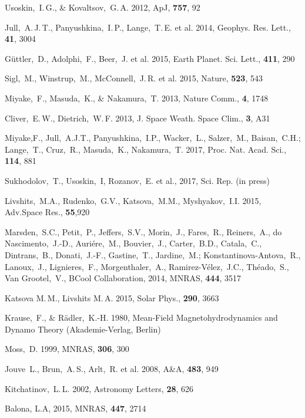\documentclass[fleqn,12pt]{SelfArx} %
\begin{document}
\begin{thebibliography}{99}
Usoskin,~I.\,G., \& Kovaltsov,~G.\,A. 2012, ApJ, \textbf{757}, 92


Jull,~A.\,J.\,T., Panyushkina,~I.\,P., Lange,~T.\,E. et al. 2014, Geophys. Res. Lett., \textbf{41}, 3004



G\"uttler,~D., Adolphi,~F., Beer,~J. et al. 2015,  Earth Planet. Sci. Lett., \textbf{411}, 290

Sigl,~M., Winstrup,~M., McConnell,~J.\,R. et al. 2015,  Nature, \textbf{523}, 543

Miyake,~F., Masuda,~K., \& Nakamura,~T. 2013, Nature Comm., \textbf{4}, 1748

Cliver,~E.\,W., Dietrich,~W.\,F. 2013,  J. Space Weath. Space Clim., \textbf{3}, A31

Miyake,F.,  Jull,~A.J.T., Panyushkina,~I.P., Wacker,~L., Salzer,~M., Baisan,~C.H.; 
Lange,~T., Cruz,~R., Masuda,~K., Nakamura,~T. 2017, Proc. Nat. Acad. Sci., \textbf{114}, 881

Sukhodolov,~T., Usoskin,~I, Rozanov,~E. et al., 2017, Sci. Rep. (in press)


Livshits,~M.A., Rudenko,~G.V., Katsova,~M.M., Myshyakov,~I.I. 2015, Adv.Space Res., \textbf{55},920


Marsden,~S.C., Petit,~P., Jeffers,~S.V., Morin,~J., Fares,~R., Reiners,~A., do Nascimento,~J.-D., Auri\'ere,~M., Bouvier,~J., Carter,~B.D., Catala,~C., Dintrans,~B., Donati,~J.-F., Gastine,~T., Jardine,~M.; 
Konstantinova-Antova,~R., Lanoux,~J., Lignieres,~F., Morgenthaler,~A., Ramirez-V\'elez,~J.C., Th\'eado,~S., Van Grootel,~V., BCool Collaboration, 2014, MNRAS, \textbf{444}, 3517 

Katsova M.\,M., Livshits M.\,A. 2015, Solar Phys., \textbf{290}, 3663

Krause,~F., \& R\"adler,~K.-H. 1980, Mean-Field Magnetohydrodynamics and Dynamo Theory (Akademie-Verlag, Berlin)

Moss,~D. 1999, MNRAS, \textbf{306}, 300


Jouve~L., Brun,~A.\,S., Arlt,~R. et al. 2008, A\&A, \textbf{483}, 949


Kitchatinov,~L.\,L. 2002, Astronomy Letters, \textbf{28}, 626

Balona, L.A, 2015, MNRAS, \textbf{447}, 2714


\end{thebibliography}
\end{document}
